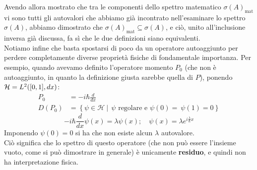 Avendo allora mostrato che tra le componenti dello spettro matematico $\sigma(A)_{\text{mat}}$ vi sono tutti gli autovalori che abbiamo già incontrato nell'esaminare lo spettro $\sigma(A)$, abbiamo dimostrato che $\sigma(A)_{\text{mat}} \subseteq \sigma(A)$, e ciò, unito all'inclusione inversa già discussa, fa sì che le due definizioni siano equivalenti.\\
Notiamo infine che basta spostarsi di poco da un operatore autoaggiunto per perdere completamente diverse proprietà fisiche di fondamentale importanza. Per esempio, quando avevamo definito l'operatore momento $P_0$ (che non è autoaggiunto, in quanto la definizione giusta sarebbe quella di $P$), ponendo $\mathcal{H} = L^2([0,1],dx)$:
\begin{align*}
P_0&=-i\hbar \frac{d}{dx}\\
D\left(P_0\right)&=\left\{\psi\in\mathcal{H}\ |\ \ \psi\text{ regolare e } \psi\left(0\right)=\ \psi\left(1\right)=0\right\}
\end{align*}
\[
-i\hbar \frac{d}{dx}\psi(x) = \lambda \psi(x); \quad \psi(x) = \lambda e^{i\frac{\lambda}{\hbar}x}
\]
Imponendo $\psi \left(0\right)=0$ si ha che non esiste alcun $\lambda$ autovalore.\\ Ciò significa che lo spettro di questo operatore (che non può essere l'insieme vuoto, come si può dimostrare in generale) è unicamente \textbf{residuo}, e quindi non ha interpretazione fisica.
%